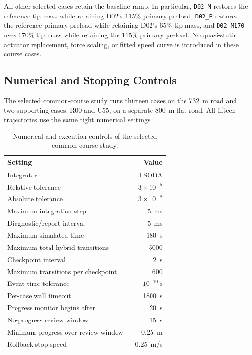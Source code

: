 \documentclass[11pt]{report}
\numberwithin{equation}{section}
\begin{document}
All other selected cases retain the baseline ramp. In particular,
\texttt{D02\_M} restores the reference tip mass while retaining D02's
\(115\%\) primary preload, \texttt{D02\_P} restores the reference primary
preload while retaining D02's \(65\%\) tip mass, and
\texttt{D02\_M170} uses \(170\%\) tip mass while retaining the \(115\%\)
primary preload. No quasi-static actuator replacement, force scaling, or
fitted speed curve is introduced in these course cases.

\subsection{Numerical and Stopping Controls}
\label{app:course_numerics}

The selected common-course study runs thirteen cases on the \SI{732}{m} road
and two supporting cases, R00 and U55, on a separate \SI{800}{m} flat road.
All fifteen trajectories use the same tight numerical settings.

\begin{table}[H]
\centering
\small
\begin{tabular}{@{}p{}r@{}}
\toprule
Setting & Value \\
\midrule
Integrator & LSODA \\
Relative tolerance & \(3\times10^{-5}\) \\
Absolute tolerance & \(3\times10^{-8}\) \\
Maximum integration step & \SI{5}{ms} \\
Diagnostic/report interval & \SI{5}{ms} \\
Maximum simulated time & \SI{180}{s} \\
Maximum total hybrid transitions & 5000 \\
Checkpoint interval & \SI{2}{s} \\
Maximum transitions per checkpoint & 600 \\
Event-time tolerance & \(10^{-10}~\mathrm{s}\) \\
Per-case wall timeout & \SI{1800}{s} \\
Progress monitor begins after & \SI{20}{s} \\
No-progress review window & \SI{15}{s} \\
Minimum progress over review window & \SI{0.25}{m} \\
Rollback stop speed & \SI{-0.25}{m/s} \\
\bottomrule
\end{tabular}
\caption{Numerical and execution controls of the selected common-course study.}
\label{tab:course_numerics}
\end{table}
\end{document}
